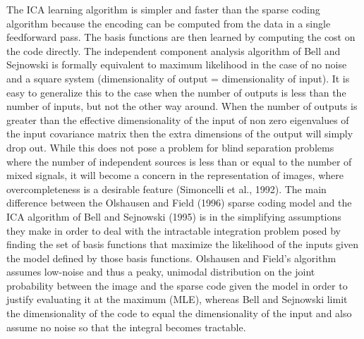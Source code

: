 The ICA learning algorithm is simpler and faster than the sparse coding algorithm because the encoding can be computed from the data in a single feedforward pass. The basis functions are then learned by computing the cost on the code directly. The independent component analysis algorithm of Bell and Sejnowski is formally equivalent to maximum likelihood in the case of no noise and a square system (dimensionality of output = dimensionality of input). It is easy to generalize this to the case when the number of outputs is less than the number of inputs, but not the other way around. When the number of outputs is greater than the effective dimensionality of the input of non zero eigenvalues of the input covariance matrix then the extra dimensions of the output will simply drop out. While this does not pose a problem for blind separation problems where the number of independent sources is less than or equal to the number of mixed signals, it will become a concern in the representation of images, where overcompleteness is a desirable feature (Simoncelli et al., 1992). The main difference between the Olshausen and Field (1996) sparse coding model and the ICA algorithm of Bell and Sejnowski (1995) is in the simplifying assumptions they make in order to deal with the intractable integration problem posed by finding the set of basis functions that maximize the likelihood of the inputs given the model defined by those basis functions. Olshausen and Field’s algorithm assumes low-noise and thus a peaky, unimodal distribution on the joint probability between the image and the sparse code given the model in order to justify evaluating it at the maximum (MLE), whereas Bell and Sejnowski limit the dimensionality of the code to equal the dimensionality of the input and also assume no noise so that the integral becomes tractable.
